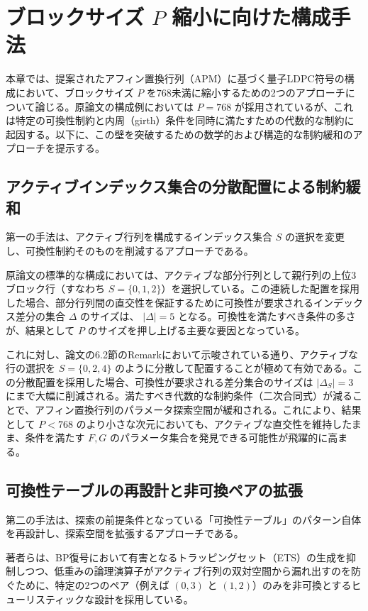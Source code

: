 \documentclass[a4paper,11pt,dvipdfmx]{jsarticle}
\theoremstyle{definition}
\begin{document}
\section{ブロックサイズ $P$ 縮小に向けた構成手法}

本章では、提案されたアフィン置換行列（APM）に基づく量子LDPC符号の構成において、ブロックサイズ $P$ を768未満に縮小するための2つのアプローチについて論じる。原論文の構成例においては $P=768$ が採用されているが、これは特定の可換性制約と内周（girth）条件を同時に満たすための代数的な制約に起因する。以下に、この壁を突破するための数学的および構造的な制約緩和のアプローチを提示する。

\subsection{アクティブインデックス集合の分散配置による制約緩和}

第一の手法は、アクティブ行列を構成するインデックス集合 $S$ の選択を変更し、可換性制約そのものを削減するアプローチである。

原論文の標準的な構成においては、アクティブな部分行列として親行列の上位3ブロック行（すなわち $S = \{0, 1, 2\}$）を選択している。この連続した配置を採用した場合、部分行列間の直交性を保証するために可換性が要求されるインデックス差分の集合 $\Delta$ のサイズは、 $|\Delta| = 5$ となる。可換性を満たすべき条件の多さが、結果として $P$ のサイズを押し上げる主要な要因となっている。

これに対し、論文の6.2節のRemarkにおいて示唆されている通り、アクティブな行の選択を $S = \{0, 2, 4\}$ のように分散して配置することが極めて有効である。この分散配置を採用した場合、可換性が要求される差分集合のサイズは $|\Delta_S| = 3$ にまで大幅に削減される。満たすべき代数的な制約条件（二次合同式）が減ることで、アフィン置換行列のパラメータ探索空間が緩和される。これにより、結果として $P < 768$ のより小さな次元においても、アクティブな直交性を維持したまま、条件を満たす $F, G$ のパラメータ集合を発見できる可能性が飛躍的に高まる。

\subsection{可換性テーブルの再設計と非可換ペアの拡張}

第二の手法は、探索の前提条件となっている「可換性テーブル」のパターン自体を再設計し、探索空間を拡張するアプローチである。

著者らは、BP復号において有害となるトラッピングセット（ETS）の生成を抑制しつつ、低重みの論理演算子がアクティブ行列の双対空間から漏れ出すのを防ぐために、特定の2つのペア（例えば $(0, 3)$ と $(1, 2)$）のみを非可換とするヒューリスティックな設計を採用している。
\end{document}
